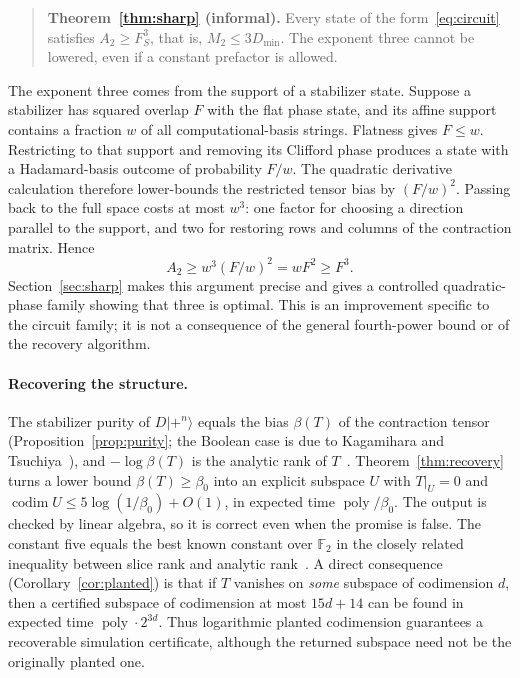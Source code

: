 \documentclass[a4paper,onecolumn,11pt,unpublished]{quantumarticle}
\theoremstyle{plain}
\theoremstyle{remark}
\newcommand{\F}{\mathbb{F}_2}
\newcommand{\ket}[1]{|#1\rangle}
\DeclareMathOperator{\codim}{codim}
\DeclareMathOperator{\poly}{poly}
\begin{document}
\begin{quote}
\textbf{Theorem~\ref{thm:sharp} (informal).} Every state of the form~\eqref{eq:circuit} satisfies $A_2\ge F_S^3$, that is, $M_2\le 3D_{\min}$. The exponent three cannot be lowered, even if a constant prefactor is allowed.
\end{quote}

The exponent three comes from the support of a stabilizer state. Suppose a stabilizer has squared overlap $F$ with the flat phase state, and its affine support contains a fraction $w$ of all computational-basis strings. Flatness gives $F\le w$. Restricting to that support and removing its Clifford phase produces a state with a Hadamard-basis outcome of probability $F/w$. The quadratic derivative calculation therefore lower-bounds the restricted tensor bias by $(F/w)^2$. Passing back to the full space costs at most $w^3$: one factor for choosing a direction parallel to the support, and two for restoring rows and columns of the contraction matrix. Hence
\[
A_2\ge w^3(F/w)^2=wF^2\ge F^3.
\]
Section~\ref{sec:sharp} makes this argument precise and gives a controlled quadratic-phase family showing that three is optimal. This is an improvement specific to the circuit family; it is not a consequence of the general fourth-power bound or of the recovery algorithm.

\paragraph{Recovering the structure.}
The stabilizer purity of $D\ket{+^n}$ equals the bias $\beta(T)$ of the contraction tensor (Proposition~\ref{prop:purity}; the Boolean case is due to Kagamihara and Tsuchiya~\cite{KT26}), and $-\log\beta(T)$ is the analytic rank of $T$~\cite{Lov19}. Theorem~\ref{thm:recovery} turns a lower bound $\beta(T)\ge\beta_0$ into an explicit subspace $U$ with $T|_U=0$ and $\codim U\le 5\log(1/\beta_0)+O(1)$, in expected time $\poly/\beta_0$. The output is checked by linear algebra, so it is correct even when the promise is false. The constant five equals the best known constant over $\F$ in the closely related inequality between slice rank and analytic rank~\cite{Lam25,MZ26}. A direct consequence (Corollary~\ref{cor:planted}) is that if $T$ vanishes on \emph{some} subspace of codimension $d$, then a certified subspace of codimension at most $15d+14$ can be found in expected time $\poly\cdot 2^{3d}$. Thus logarithmic planted codimension guarantees a recoverable simulation certificate, although the returned subspace need not be the originally planted one.
\end{document}
